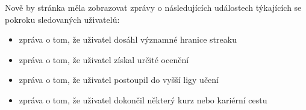 Nově by stránka měla zobrazovat zprávy o následujících událostech týkajících se pokroku sledovaných uživatelů:

\begin{itemize}
    \item zpráva o tom, že uživatel dosáhl významné hranice streaku
    \item zpráva o tom, že uživatel získal určité ocenění
    \item zpráva o tom, že uživatel postoupil do vyšší ligy učení
    \item zpráva o tom, že uživatel dokončil některý kurz nebo kariérní cestu
\end{itemize}